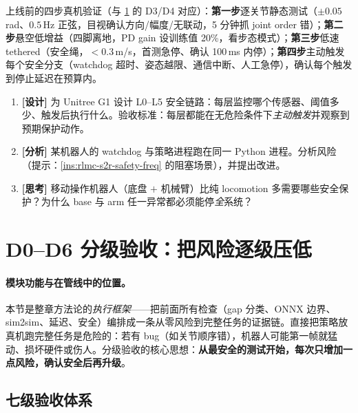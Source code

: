 上线前的四步真机验证（与 \cref{sec:rlmc-s2r-grading} 的 D3/D4 对应）：\textbf{第一步}逐关节静态测试（$\pm0.05$\,rad、$0.5$\,Hz 正弦，目视确认方向/幅度/无联动，5 分钟抓 joint order 错）；\textbf{第二步}悬空低增益（四脚离地，PD gain 设训练值 20\%，看步态模式）；\textbf{第三步}低速 tethered（安全绳，$<0.3$\,m/s，首测急停、确认 100\,ms 内停）；\textbf{第四步}主动触发每个安全分支（watchdog 超时、姿态越限、通信中断、人工急停），确认每个触发到停止延迟在预算内。

\begin{practice}[安全链路动手]
\begin{enumerate}
  \item \textbf{[设计]} 为 Unitree G1 设计 L0--L5 安全链路：每层监控哪个传感器、阈值多少、触发后执行什么。验收标准：每层都能在无危险条件下\emph{主动触发}并观察到预期保护动作。
  \item \textbf{[分析]} 某机器人的 watchdog 与策略进程跑在同一 Python 进程。分析风险（提示：\cref{ins:rlmc-s2r-safety-freq} 的阻塞场景），并提出改进。
  \item \textbf{[思考]} 移动操作机器人（底盘 $+$ 机械臂）比纯 locomotion 多需要哪些安全保护？为什么 base 与 arm 任一异常都必须能停\emph{全}系统？
\end{enumerate}
\end{practice}

\section{D0--D6 分级验收：把风险逐级压低}
\label{sec:rlmc-s2r-grading}

\paragraph{模块功能与在管线中的位置。}本节是整章方法论的\emph{执行框架}——把前面所有检查（gap 分类、ONNX 边界、sim2sim、延迟、安全）编排成一条从零风险到完整任务的证据链。直接把策略放真机跑完整任务是危险的：若有 bug（如关节顺序错），机器人可能第一帧就猛动、损坏硬件或伤人。分级验收的核心思想：\textbf{从最安全的测试开始，每次只增加一点风险，确认安全后再升级}。

\subsection{七级验收体系}
\label{sec:rlmc-s2r-seven-levels}

